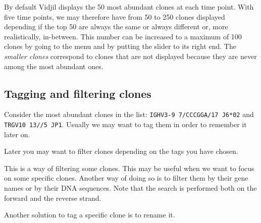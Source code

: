 \documentclass[10pt]{article}
\begin{document}
By default Vidjil displays the 50 most abundant clones at each time point.
With five time points, we may therefore have from 50 to 250 clones displayed
depending if the top 50 are always the same or always different or, more
realistically, in-between.
This number can be increased to a maximum of 100 clones by going to the  menu and by putting the
slider to its right end.
The \textit{smaller clones} correspond to clones that are not displayed
because they are never among the most abundant ones.


\subsection{Tagging and filtering clones}

Consider the most abundant clones in the list:  \texttt{IGHV3-9 7/CCCGGA/17 J6*02} and  \texttt{TRGV10 13//5 JP1}.
Usually we may want to tag them in order to remember it later on.

Later you may want to filter clones depending on the tags you have chosen.


This is a way of filtering some clones. This may be useful when we want to
focus on some specific clones. Another way of doing so is to filter them by
their gene names or by their DNA sequences.  
Note that the search is performed both on the forward and the reverse strand.

\bigskip

Another solution to tag a specific clone is to rename it.


\bigskip
\end{document}
